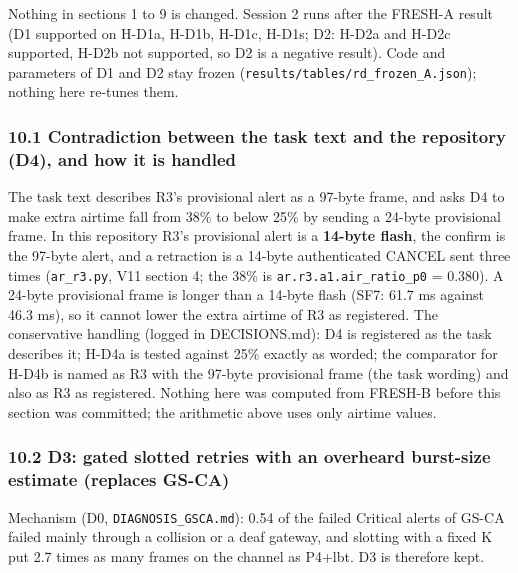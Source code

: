 Nothing in sections 1 to 9 is changed. Session 2 runs after the FRESH-A result (D1 supported on H-D1a, H-D1b, H-D1c, H-D1s; D2: H-D2a and H-D2c supported, H-D2b not supported, so D2 is a negative result). Code and parameters of D1 and D2 stay frozen (\texttt{results/tables/rd\_frozen\_A.json}); nothing here re-tunes them.

\subsubsection*{10.1 Contradiction between the task text and the repository (D4), and how it is handled}
The task text describes R3's provisional alert as a 97-byte frame, and asks D4 to make extra airtime fall from 38\% to below 25\% by sending a 24-byte provisional frame. In this repository R3's provisional alert is a \textbf{14-byte flash}, the confirm is the 97-byte alert, and a retraction is a 14-byte authenticated CANCEL sent three times (\texttt{ar\_r3.py}, V11 section 4; the 38\% is \texttt{ar.r3.a1.air\_ratio\_p0} = 0.380). A 24-byte provisional frame is longer than a 14-byte flash (SF7: 61.7 ms against 46.3 ms), so it cannot lower the extra airtime of R3 as registered. The conservative handling (logged in DECISIONS.md): D4 is registered as the task describes it; H-D4a is tested against 25\% exactly as worded; the comparator for H-D4b is named as R3 with the 97-byte provisional frame (the task wording) and also as R3 as registered. Nothing here was computed from FRESH-B before this section was committed; the arithmetic above uses only airtime values.

\subsubsection*{10.2 D3: gated slotted retries with an overheard burst-size estimate (replaces GS-CA)}
Mechanism (D0, \texttt{DIAGNOSIS\_GSCA.md}): 0.54 of the failed Critical alerts of GS-CA failed mainly through a collision or a deaf gateway, and slotting with a fixed K put 2.7 times as many frames on the channel as P4+lbt. D3 is therefore kept.

